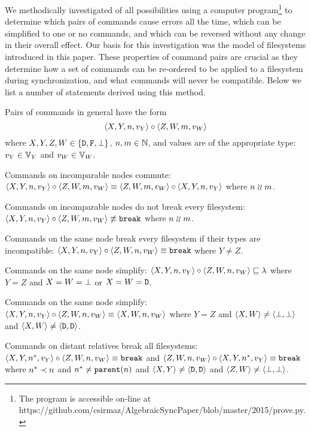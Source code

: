 We methodically investigated of all possibilities using a computer 
program\footnote{The program is accessible on-line at \\
https://github.com/csirmaz/AlgebraicSyncPaper/blob/master/2015/prove.py.}
to determine
which pairs of commands cause errors all the time,
which can be simplified to one or no commands, and which can be reversed
without any change in their overall effect.
Our basis for this investigation was the model of filesystems introduced in this paper.
These properties of command pairs are crucial as they determine
how a set of commands can be re-ordered to be applied to a filesystem
during synchronization, and what commands will never be compatible.
Below we list a number of statements derived using this method.

\bigskip

\noindent
Pairs of commands in general have the form
\[ \langle{X,Y,n,v_Y}\rangle\circ  \langle{Z,W,m,v_W}\rangle \]
where $X,Y,Z,W\in\{\mathtt{D},\mathtt{F},\bot\}$, $n,m\in\mathbb{N}$, 
and values are of the appropriate type: 
$v_Y\in\mathbb{V}_{Y}$ and $v_W\in\mathbb{V}_{W}$.

\begin{myax}\label{ax_separate_commute}
Commands on incomparable nodes commute:
$\langle{X,Y,n,v_Y}\rangle\circ\langle{Z,W,m,v_W}\rangle \equiv \langle{Z,W,m,v_W}\rangle\circ\langle{X,Y,n,v_Y}\rangle$ where $n\mathrel{\wr\wr} m$.
\end{myax}

\begin{myax}\label{ax_separate_nobreaks}
Commands on incomparable nodes do not break every filesystem:
$\langle{X,Y,n,v_Y}\rangle\circ\langle{Z,W,m,v_W}\rangle \not\equiv \mathtt{break}$ where $n\mathrel{\wr\wr} m$.
\end{myax}

\begin{myax}\label{ax_same_breaks}
Commands on the same node break every filesystem if their types are incompatible:
$\langle{X,Y,n,v_Y}\rangle\circ\langle{Z,W,n,v_W}\rangle \equiv \mathtt{break}$ where $Y\ne Z$.
\end{myax}

\begin{myax}\label{ax_same_emptyseq}
Commands on the same node simplify:
$\langle{X,Y,n,v_Y}\rangle\circ\langle{Z,W,n,v_W}\rangle \sqsubseteq \lambda$ where $Y=Z$ and $X=W=\bot$ 
or $X=W=\mathtt{D}$.
\end{myax}

\begin{myax}\label{ax_same_singlec}
Commands on the same node simplify:
$\langle{X,Y,n,v_Y}\rangle\circ \langle{Z,W,n,v_W}\rangle \equiv \langle{X,W,n,v_W}\rangle$ where $Y=Z$ and $\langle{X,W}\rangle\neq\langle{\bot,\bot}\rangle$ and $\langle{X,W}\rangle\neq\langle{\mathtt{D},\mathtt{D}}\rangle$.
\end{myax}

\begin{myax}\label{ax_distantrel_breaks}
Commands on distant relatives break all filesystems:
$\langle{X,Y,n^*,v_Y}\rangle\circ\langle{Z,W,n,v_W}\rangle \equiv \mathtt{break}$
and $\langle{Z,W,n,v_W}\rangle\circ\langle{X,Y,n^*,v_Y}\rangle \equiv\mathtt{break}$
where $n^*\prec n$ and $n^*\neq\mathtt{parent}(n)$ and $\langle{X,Y}\rangle\neq\langle{\mathtt{D},\mathtt{D}}\rangle$ and $\langle{Z,W}\rangle\neq\langle{\bot,\bot}\rangle$.
\end{myax}

